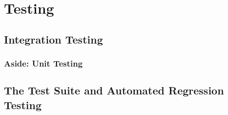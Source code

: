 \chapter{Testing}

\section{Integration Testing}
	

	\subsection{Aside: Unit Testing}

\section{The Test Suite and Automated Regression Testing}

